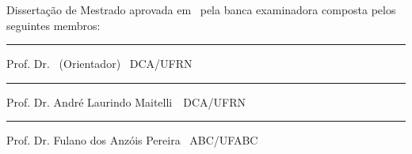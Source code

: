 \begin{titlepage}
\begin{center}

\LARGE

\textbf{\titulo}

\vfill

\Large

\textbf{\autor}

\end{center}

\vfill

\noindent
Dissertação de Mestrado aprovada em \dataaprovacao\ pela banca
examinadora composta pelos seguintes membros:

\begin{center}


\vspace{1.5cm}\rule{0.95\linewidth}{1pt}
\parbox{0.9\linewidth}{%
Prof. Dr. \orientador\ (Orientador) \dotfill\ DCA/UFRN}

\vspace{1.5cm}\rule{0.95\linewidth}{1pt}
\parbox{0.9\linewidth}{%
Prof. Dr. André Laurindo Maitelli\ \dotfill\ DCA/UFRN}

\vspace{1.5cm}\rule{0.95\linewidth}{1pt}
\parbox{0.9\linewidth}{%
Prof. Dr. Fulano dos Anzóis Pereira \dotfill\ ABC/UFABC}

\end{center}
\end{titlepage}

